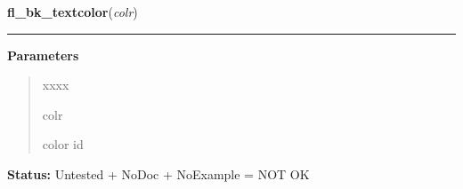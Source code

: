     \label{xformslib:library:fl_bk_textcolor}

    \vspace{0.5ex}

\hspace{.8\funcindent}\begin{boxedminipage}{\funcwidth}

    \raggedright \textbf{fl\_bk\_textcolor}(\textit{colr})

    \vspace{-1.5ex}

    \rule{\textwidth}{0.5\fboxrule}
\setlength{\parskip}{2ex}
\setlength{\parskip}{1ex}
      \textbf{Parameters}
      \vspace{-1ex}

      \begin{quote}
        \begin{Ventry}{xxxx}

          \item[colr]

          color id

        \end{Ventry}

      \end{quote}

\textbf{Status:} Untested + NoDoc + NoExample = NOT OK



    \end{boxedminipage}

    \label{xformslib:library:fl_set_gamma}

    \vspace{0.5ex}

